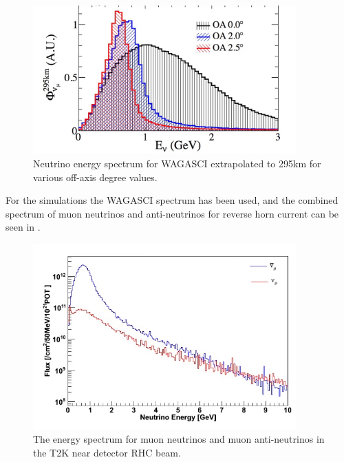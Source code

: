\begin{figure}[h!]
\centering
\includegraphics[width=0.9\textwidth]{figures/NeutrinoChap/offAxisFlux.jpeg}
\caption{Neutrino energy spectrum for WAGASCI extrapolated to 295km for various off-axis degree values.}
\label{fig:T2KAxis2}
\end{figure}

For the simulations the WAGASCI spectrum has been used, and the combined spectrum of muon neutrinos and anti-neutrinos for reverse horn current can be seen in .



\begin{figure}[h!]
\centering
\includegraphics[width=0.9\textwidth]{figures/WAGASCIflux.jpeg}
\caption{The energy spectrum for muon neutrinos and muon anti-neutrinos in the T2K near detector RHC beam.}
\label{fig:T2KndSpectrum}
\end{figure}


